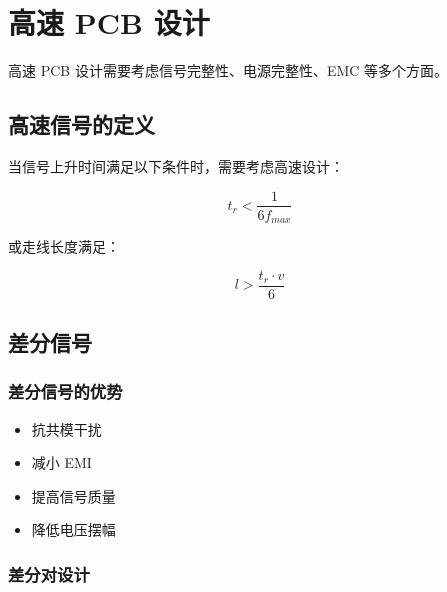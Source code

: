\section{高速 PCB 设计}

高速 PCB 设计需要考虑信号完整性、电源完整性、EMC 等多个方面。

\subsection{高速信号的定义}

当信号上升时间满足以下条件时，需要考虑高速设计：

\begin{equation}
t_r < \frac{1}{6 f_{max}} \label{eq:high-speed-condition}
\end{equation}

或走线长度满足：

\begin{equation}
l > \frac{t_r \cdot v}{6} \label{eq:high-speed-length}
\end{equation}

\subsection{差分信号}

\subsubsection{差分信号的优势}

\begin{itemize}
  \item 抗共模干扰
  \item 减小 EMI
  \item 提高信号质量
  \item 降低电压摆幅
\end{itemize}

\subsubsection{差分对设计}

